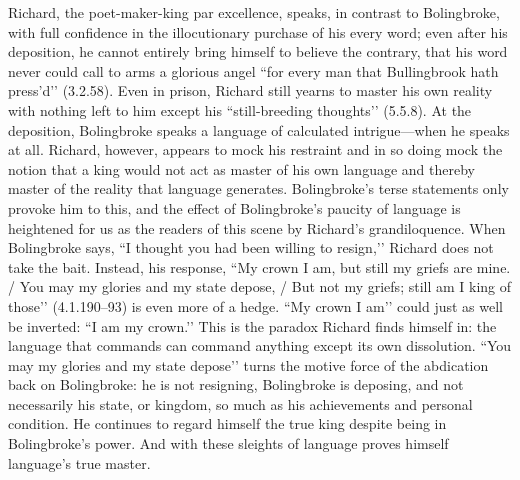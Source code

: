 Richard, the poet-maker-king par excellence, speaks, in contrast to Bolingbroke, with full confidence in the illocutionary purchase of his every word; even after his deposition, he cannot entirely bring himself to believe the contrary, that his word never could call to arms a glorious angel ``for every man that Bullingbrook hath press’d’’ (3.2.58).
Even in prison, Richard still yearns to master his own reality with nothing left to him except his ``still-breeding thoughts’’ (5.5.8).
At the deposition, Bolingbroke speaks a language of calculated intrigue---when he speaks at all.
Richard, however, appears to mock his restraint and in so doing mock the notion that a king would not act as master of his own language and thereby master of the reality that language generates.
Bolingbroke’s terse statements only provoke him to this, and the effect of Bolingbroke’s paucity of language is heightened for us as the readers of this scene by Richard’s grandiloquence.
When Bolingbroke says, ``I thought you had been willing to resign,’’ Richard does not take the bait.
Instead, his response, ``My crown I am, but still my griefs are mine.
/ You may my glories and my state depose, / But not my griefs; still am I king of those’’ (4.1.190--93) is even more of a hedge.
``My crown I am’’ could just as well be inverted: ``I am my crown.’’ This is the paradox Richard finds himself in: the language that commands can command anything except its own dissolution.
``You may my glories and my state depose’’ turns the motive force of the abdication back on Bolingbroke: he is not resigning, Bolingbroke is deposing, and not necessarily his state, or kingdom, so much as his achievements and personal condition.
He continues to regard himself the true king despite being in Bolingbroke’s power.
And with these sleights of language proves himself language’s true master.

